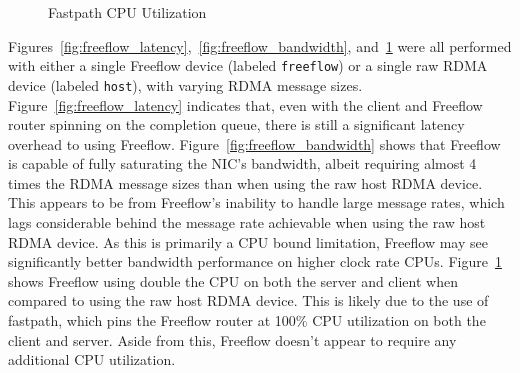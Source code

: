 \documentclass[12pt,titlepage]{article}
\begin{document}
\begin{figure}
	\centering
	\caption{Fastpath CPU Utilization}%
	\label{fig:freeflow_cpu}
\end{figure}

Figures~\ref{fig:freeflow_latency},~\ref{fig:freeflow_bandwidth}, and~\ref{fig:freeflow_cpu} were all performed with either a single Freeflow device (labeled \texttt{freeflow}) or a single raw RDMA device (labeled \texttt{host}), with varying RDMA message sizes.
Figure~\ref{fig:freeflow_latency} indicates that, even with the client and Freeflow router spinning on the completion queue, there is still a significant latency overhead to using Freeflow.
Figure~\ref{fig:freeflow_bandwidth} shows that Freeflow is capable of fully saturating the NIC's bandwidth, albeit requiring almost 4 times the RDMA message sizes than when using the raw host RDMA device.
This appears to be from Freeflow's inability to handle large message rates, which lags considerable behind the message rate achievable when using the raw host RDMA device.
As this is primarily a CPU bound limitation, Freeflow may see significantly better bandwidth performance on higher clock rate CPUs.
Figure~\ref{fig:freeflow_cpu} shows Freeflow using double the CPU on both the server and client when compared to using the raw host RDMA device.
This is likely due to the use of fastpath, which pins the Freeflow router at 100\% CPU utilization on both the client and server. 
Aside from this, Freeflow doesn't appear to require any additional CPU utilization.
\end{document}
